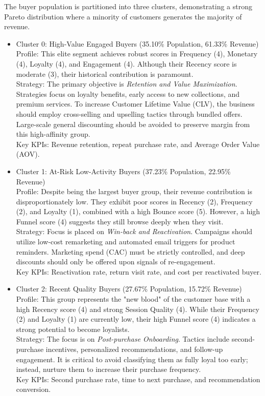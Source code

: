 \documentclass[conference]{IEEEtran}
\begin{document}
The buyer population is partitioned into three clusters, demonstrating a strong Pareto distribution where a minority of customers generates the majority of revenue.

\begin{itemize}
    \item Cluster 0: High-Value Engaged Buyers (35.10\% Population, 61.33\% Revenue) \\
    Profile: This elite segment achieves robust scores in Frequency (4), Monetary (4), Loyalty (4), and Engagement (4). Although their Recency score is moderate (3), their historical contribution is paramount. \\
    Strategy: The primary objective is \textit{Retention and Value Maximization}. Strategies focus on loyalty benefits, early access to new collections, and premium services. To increase Customer Lifetime Value (CLV), the business should employ cross-selling and upselling tactics through bundled offers. Large-scale general discounting should be avoided to preserve margin from this high-affinity group. \\
    Key KPIs: Revenue retention, repeat purchase rate, and Average Order Value (AOV).

    \item Cluster 1: At-Risk Low-Activity Buyers (37.23\% Population, 22.95\% Revenue) \\
    Profile: Despite being the largest buyer group, their revenue contribution is disproportionately low. They exhibit poor scores in Recency (2), Frequency (2), and Loyalty (1), combined with a high Bounce score (5). However, a high Funnel score (4) suggests they still browse deeply when they visit. \\
    Strategy: Focus is placed on \textit{Win-back and Reactivation}. Campaigns should utilize low-cost remarketing and automated email triggers for product reminders. Marketing spend (CAC) must be strictly controlled, and deep discounts should only be offered upon signals of re-engagement. \\
    Key KPIs: Reactivation rate, return visit rate, and cost per reactivated buyer.

    \item Cluster 2: Recent Quality Buyers (27.67\% Population, 15.72\% Revenue) \\
    Profile: This group represents the "new blood" of the customer base with a high Recency score (4) and strong Session Quality (4). While their Frequency (2) and Loyalty (1) are currently low, their high Funnel score (4) indicates a strong potential to become loyalists. \\
    Strategy: The focus is on \textit{Post-purchase Onboarding}. Tactics include second-purchase incentives, personalized recommendations, and follow-up engagement. It is critical to avoid classifying them as fully loyal too early; instead, nurture them to increase their purchase frequency. \\
    Key KPIs: Second purchase rate, time to next purchase, and recommendation conversion.
\end{itemize}
\end{document}
